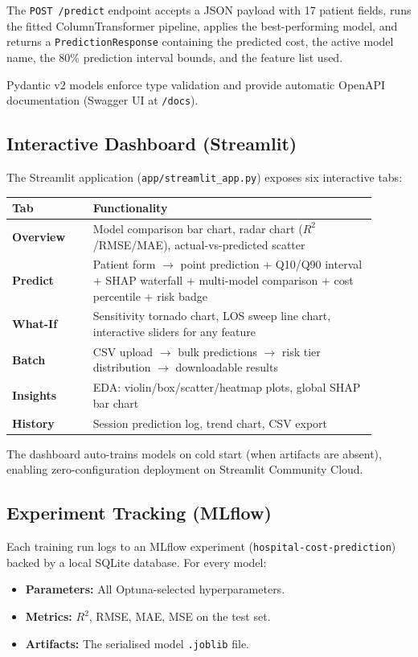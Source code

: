 \documentclass[11pt,a4paper]{article}
\begin{document}
The \texttt{POST /predict} endpoint accepts a JSON payload with 17 patient fields, runs the fitted ColumnTransformer pipeline, applies the best-performing model, and returns a \texttt{PredictionResponse} containing the predicted cost, the active model name, the 80\% prediction interval bounds, and the feature list used.

Pydantic v2 models enforce type validation and provide automatic OpenAPI documentation (Swagger UI at \texttt{/docs}).

\subsection{Interactive Dashboard (Streamlit)}
The Streamlit application (\texttt{app/streamlit\_app.py}) exposes six interactive tabs:

\begin{table}[h]
\centering
\begin{tabular}{p{0.20\linewidth} p{0.70\linewidth}}
\toprule
\textbf{Tab} & \textbf{Functionality} \\
\midrule
\textbf{Overview} & Model comparison bar chart, radar chart ($R^2$/RMSE/MAE), actual-vs-predicted scatter \\
\textbf{Predict} & Patient form $\rightarrow$ point prediction + Q10/Q90 interval + SHAP waterfall + multi-model comparison + cost percentile + risk badge \\
\textbf{What-If} & Sensitivity tornado chart, LOS sweep line chart, interactive sliders for any feature \\
\textbf{Batch} & CSV upload $\rightarrow$ bulk predictions $\rightarrow$ risk tier distribution $\rightarrow$ downloadable results \\
\textbf{Insights} & EDA: violin/box/scatter/heatmap plots, global SHAP bar chart \\
\textbf{History} & Session prediction log, trend chart, CSV export \\
\bottomrule
\end{tabular}
\end{table}

The dashboard auto-trains models on cold start (when artifacts are absent), enabling zero-configuration deployment on Streamlit Community Cloud.

\subsection{Experiment Tracking (MLflow)}
Each training run logs to an MLflow experiment (\texttt{hospital-cost-prediction}) backed by a local SQLite database. For every model:
\begin{itemize}
  \item \textbf{Parameters:} All Optuna-selected hyperparameters.
  \item \textbf{Metrics:} $R^2$, RMSE, MAE, MSE on the test set.
  \item \textbf{Artifacts:} The serialised model \texttt{.joblib} file.
\end{itemize}
\end{document}
